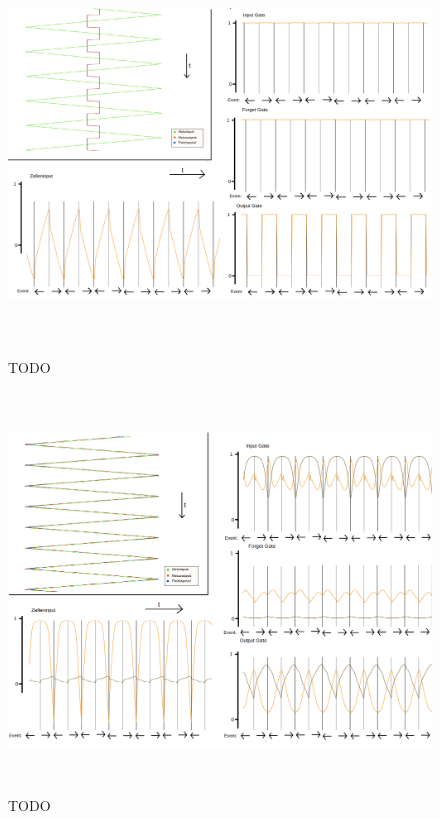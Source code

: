 \begin{figure}
	\centering
	\includegraphics[width=\textwidth, height=400px]{pics/act1.png}	
	\caption{TODO }
	\label{img:act1}
\end{figure}
\begin{figure}
	\centering
	\includegraphics[width=\textwidth, height=400px]{pics/act2.png}	
	\caption{TODO }
	\label{img:act2}
\end{figure}
